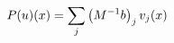 \documentclass[preview]{standalone}
\begin{document}
\begin{align*}
\special{dvisvgm:raw <g id='unique000'>}P(u)(x) = \sum_j \big(M^{-1}b\big)_j\, v_j(x)\special{dvisvgm:raw </g>}
\end{align*}
\end{document}
